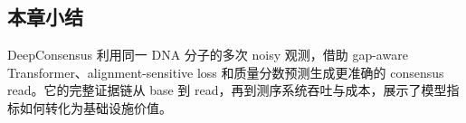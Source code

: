 
\subsection{本章小结}

DeepConsensus 利用同一 DNA 分子的多次 noisy 观测，借助 gap-aware Transformer、alignment-sensitive loss 和质量分数预测生成更准确的 consensus read。它的完整证据链从 base 到 read，再到测序系统吞吐与成本，展示了模型指标如何转化为基础设施价值。

